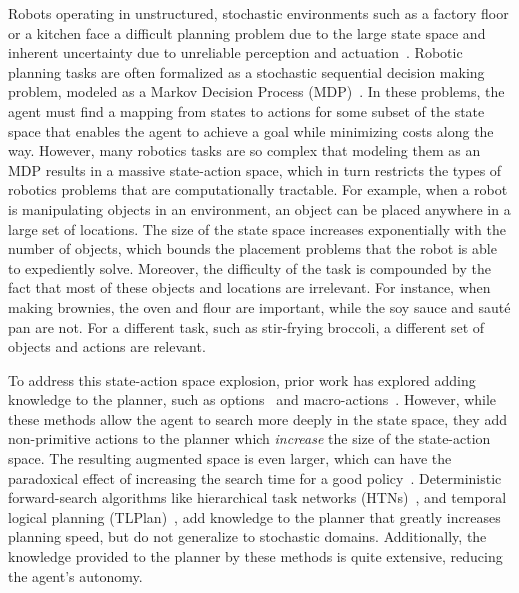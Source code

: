 \documentclass[letterpaper]{article}
\begin{document}
Robots operating in unstructured, stochastic environments such as a
factory floor or a kitchen face a difficult planning problem due to
the large state space and inherent uncertainty due to unreliable
perception and actuation~\citep{bollini12,knepper13}.  Robotic
planning tasks are often formalized as a stochastic sequential
decision making problem, modeled as a Markov Decision Process
(MDP)~\citep{thrun2008probabilistic}. In these problems, the agent
must find a mapping from states to actions for some subset of the
state space that enables the agent to achieve a goal while minimizing
costs along the way. However, many robotics tasks are so complex that
modeling them as an MDP results in a massive state-action space, which
in turn restricts the types of robotics problems that are
computationally tractable. For example, when a robot is manipulating
objects in an environment, an object can be placed anywhere in a large
set of locations. The size of the state space increases exponentially
with the number of objects, which bounds the placement problems that
the robot is able to expediently solve. Moreover, the difficulty of the task is compounded
by the fact that most of these objects and locations are irrelevant. For instance, when making brownies,
the oven and flour are important, while the soy sauce and saut\'{e}
pan are not.  For a different task, such as stir-frying broccoli, a
different set of objects and actions are relevant.

To address this state-action space explosion, prior work has explored
adding knowledge to the planner, such as options~\cite{sutton99} and
macro-actions~\cite{Botea:2005kx,Newton:2005vn}.  However, while these
methods allow the agent to search more deeply in the state space, they
add non-primitive actions to the planner which {\em increase} the size of
the state-action space.  The resulting augmented space is even larger,
which can have the paradoxical effect of increasing the search time
for a good policy~\cite{Jong:2008zr}.  
Deterministic forward-search algorithms like hierarchical task
networks (HTNs)~\citep{Nau:1999:SSH:1624312.1624357}, and temporal
logical planning (TLPlan)~\citep{Bacchus95usingtemporal,Bacchus99usingtemporal},
add knowledge to the planner that greatly increases planning speed, but do
not generalize to stochastic domains. Additionally, the knowledge
provided to the planner by these methods is quite extensive, reducing the
agent's autonomy.
\end{document}

